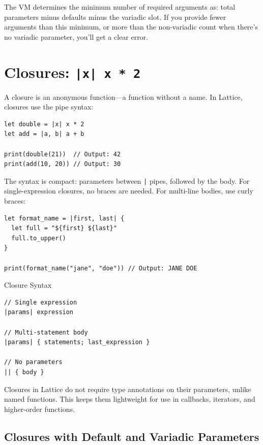 The VM determines the minimum number of required arguments as: total parameters minus defaults minus the variadic slot. If you provide fewer arguments than this minimum, or more than the non-variadic count when there's no variadic parameter, you'll get a clear error.

\section{Closures: \texttt{|x| x * 2}}\label{sec:closures}

A closure is an anonymous function---a function without a name. In Lattice, closures use the pipe syntax:

\begin{lstlisting}[language=Lattice, caption={Basic closure syntax}]
let double = |x| x * 2
let add = |a, b| a + b

print(double(21))  // Output: 42
print(add(10, 20)) // Output: 30
\end{lstlisting}

The syntax is compact: parameters between \lstinline{|} pipes, followed by the body. For single-expression closures, no braces are needed. For multi-line bodies, use curly braces:

\begin{lstlisting}[language=Lattice, caption={Multi-line closures}]
let format_name = |first, last| {
  let full = "${first} ${last}"
  full.to_upper()
}

print(format_name("jane", "doe")) // Output: JANE DOE
\end{lstlisting}

\begin{defnbox}{Closure Syntax}
\begin{lstlisting}[language=Lattice, numbers=none]
// Single expression
|params| expression

// Multi-statement body
|params| { statements; last_expression }

// No parameters
|| { body }
\end{lstlisting}
Closures in Lattice do not require type annotations on their parameters, unlike named functions. This keeps them lightweight for use in callbacks, iterators, and higher-order functions.
\end{defnbox}

\subsection{Closures with Default and Variadic Parameters}\label{sec:closure-defaults}

